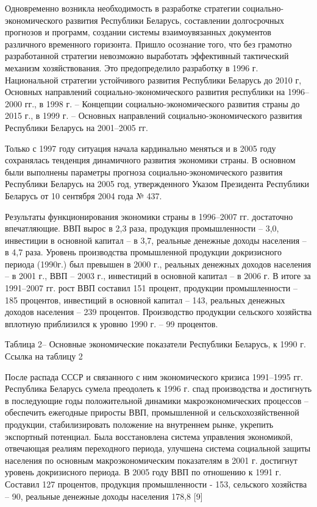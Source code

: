 \documentclass[14pt,a4paper]{article}
\begin{document}
    Одновременно возникла необходимость в разработке стратегии социально- экономического развития Республики Беларусь, составлении долгосрочных прогнозов и программ, создании системы взаимоувязанных документов различного временного горизонта.
    Пришло осознание того, что без грамотно разработанной стратегии невозможно выработать эффективный тактический механизм хозяйствования.
    Это предопределило разработку в 1996 г. Национальной стратегии устойчивого развития Республики Беларусь до 2010 г, Основных направлений социально-экономического развития республики на 1996--2000 гг., в 1998 г. – Концепции социально-экономического развития страны до 2015 г., в 1999 г. – Основных направлений социально-экономического развития Республики Беларусь на 2001--2005 гг.
    \par
    Только с 1997 году ситуация начала кардинально меняться и в 2005 году сохранялась тенденция динамичного развития экономики страны.
    В основном были выполнены параметры прогноза социально-экономического развития Республики Беларусь на 2005 год, утвержденного Указом Президента Республики Беларусь от 10 сентября 2004 года № 437.
    \par
    Результаты функционирования экономики страны в 1996--2007 гг. достаточно впечатляющие.
    ВВП вырос в 2,3 раза, продукция промышленности – 3,0, инвестиции в основной капитал – в 3,7, реальные денежные доходы населения – в 4,7 раза.
    Уровень производства промышленной продукции докризисного периода (1990г.) был превышен в 2000 г., реальных денежных доходов населения – в 2001 г., ВВП – 2003 г., инвестиций в основной капитал – в 2006 г.
    В итоге за 1991--2007 гг. рост ВВП составил 151 процент, продукции промышленности – 185 процентов, инвестиций в основной капитал – 143, реальных денежных доходов населения – 239 процентов.
    Производство продукции сельского хозяйства вплотную приблизился к уровню 1990 г. – 99 процентов.
    \\
    \par
    Таблица 2– Основные экономические показатели Республики Беларусь, к 1990 г.
    \\
    Ссылка на таблицу 2
    \par
    После распада СССР и связанного с ним экономического кризиса 1991--1995 гг. Республика Беларусь сумела преодолеть к 1996 г. спад производства и достигнуть в последующие годы положительной динамики макроэкономических процессов – обеспечить ежегодные приросты ВВП, промышленной и сельскохозяйственной продукции, стабилизировать положение на внутреннем рынке, укрепить экспортный потенциал.
    Была восстановлена система управления экономикой, отвечающая реалиям переходного периода, улучшена система социальной защиты населения по основным макроэкономическим показателям в 2001 г. достигнут уровень докризисного периода.
    В 2005 году ВВП по отношению к 1991 г.
    Составил 127 процентов, продукция промышленности - 153, сельского хозяйства – 90, реальные денежные доходы населения 178,8 [9]
\end{document}
